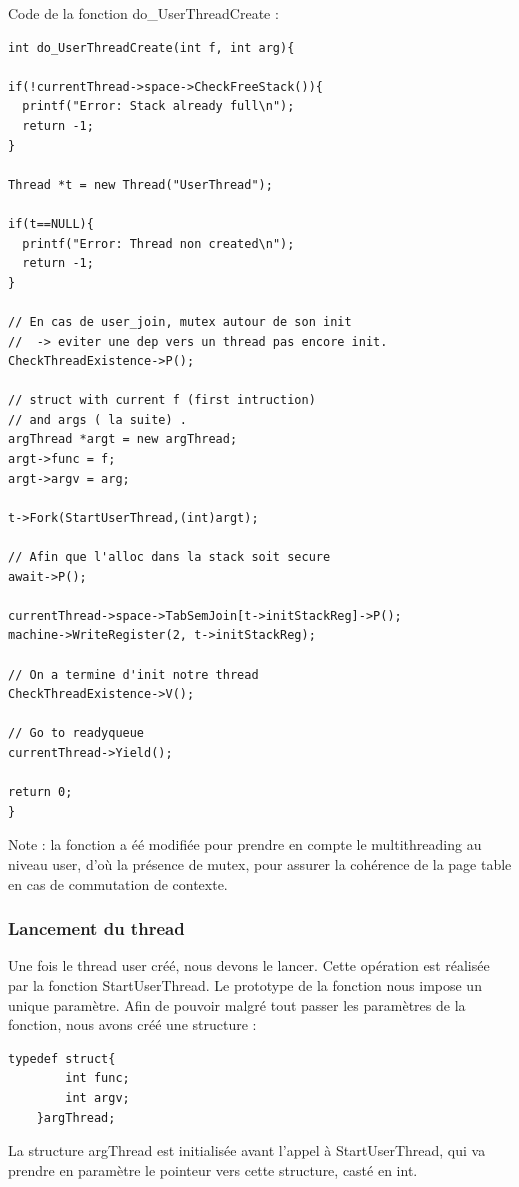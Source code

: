 \documentclass[a4paper,10pt]{article}
\begin{document}
Code de la fonction do\_UserThreadCreate :
\begin{lstlisting}[frame=single]
int do_UserThreadCreate(int f, int arg){

if(!currentThread->space->CheckFreeStack()){
  printf("Error: Stack already full\n");
  return -1;
}

Thread *t = new Thread("UserThread");

if(t==NULL){
  printf("Error: Thread non created\n");
  return -1;
}

// En cas de user_join, mutex autour de son init
//  -> eviter une dep vers un thread pas encore init.
CheckThreadExistence->P();

// struct with current f (first intruction)
// and args ( la suite) .
argThread *argt = new argThread;
argt->func = f;
argt->argv = arg;

t->Fork(StartUserThread,(int)argt);

// Afin que l'alloc dans la stack soit secure
await->P();

currentThread->space->TabSemJoin[t->initStackReg]->P();
machine->WriteRegister(2, t->initStackReg);

// On a termine d'init notre thread
CheckThreadExistence->V();

// Go to readyqueue
currentThread->Yield();

return 0;
}
\end{lstlisting}
Note : la fonction a éé modifiée pour prendre en compte le multithreading au niveau user, d'où la présence de mutex, pour assurer la cohérence de la page table
en cas de commutation de contexte.

\subsubsection{Lancement du thread}
Une fois le thread user créé, nous devons le lancer. Cette opération est réalisée par la fonction StartUserThread.
Le prototype de la fonction nous impose un unique paramètre. Afin de pouvoir malgré tout passer les paramètres de la fonction,
nous avons créé une structure :
\begin{lstlisting}[frame=single]
 typedef struct{
		int func;
		int argv;
	}argThread;
\end{lstlisting}

La structure argThread  est initialisée avant l'appel à StartUserThread, qui va prendre en paramètre le pointeur vers cette structure, casté en int.
\end{document}
